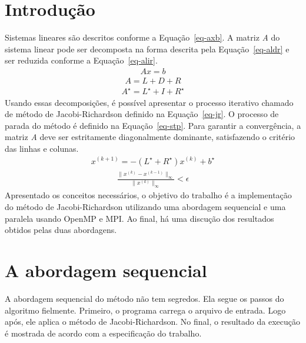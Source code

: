 \documentclass[a4paper]{article}
\begin{document}
\section{Introdução}
\indent \indent Sistemas lineares são descritos conforme a Equação~\ref{eq-axb}. A matriz \emph{A} do sistema linear pode ser decomposta na forma descrita pela Equação~\ref{eq-aldr} e ser reduzida conforme a Equação~\ref{eq-alir}.
\begin{eqnarray} \label{eq-axb}
	Ax = b
\end{eqnarray}
\begin{eqnarray} \label{eq-aldr}
	A = L + D + R
\end{eqnarray}
\begin{eqnarray} \label{eq-alir}
	A^\star = L^\star + I + R^\star 
\end{eqnarray}
\indent Usando essas decomposições, é possível apresentar o processo iterativo chamado de método de Jacobi-Richardson definido na Equação~\ref{eq-jr}. O processo de parada do método é definido na Equação~\ref{eq-stp}. Para garantir a convergência, a matriz \emph{A} deve ser estritamente diagonalmente dominante, satisfazendo o critério das linhas e colunas.
\begin{eqnarray} \label{eq-jr}
	x^{(k+1)} = -(L^\star + R^\star)x^{(k)} + b^\star
\end{eqnarray}
\begin{eqnarray} \label{eq-stp}
	\frac{\parallel x^{(k)} - x^{(k-1)}\parallel_\infty}{\parallel x^{(k)}\parallel_\infty} < \epsilon
\end{eqnarray}
\indent Apresentado os conceitos necessários, o objetivo do trabalho é a implementação do método de Jacobi-Richardson utilizando uma abordagem sequencial e uma paralela usando OpenMP e MPI. Ao final, há uma discução dos resultados obtidos pelas duas abordagens.

\section{A abordagem sequencial}
\indent \indent A abordagem sequencial do método não tem segredos. Ela segue os passos do algoritmo fielmente. Primeiro, o programa carrega o arquivo de entrada. Logo após, ele aplica o método de Jacobi-Richardson. No final, o resultado da execução é mostrada de acordo com a especificação do trabalho.
\end{document}
